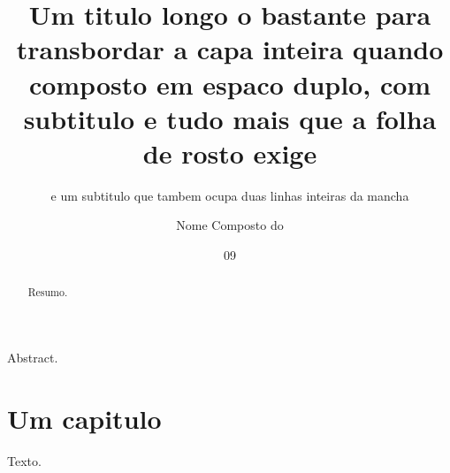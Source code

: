 \documentclass[dsc,doublespacing]{ufrj}
\title{Um titulo longo o bastante para transbordar a capa inteira quando composto
em espaco duplo, com subtitulo e tudo mais que a folha de rosto exige}
\subtitle{e um subtitulo que tambem ocupa duas linhas inteiras da mancha}
\author{Nome Composto do}{Autor de Sobrenome Longo}
\date{09}{2026}
\begin{document}
  \maketitle
  \frontmatter
  \begin{abstract}Resumo.\end{abstract}
  \begin{foreignabstract}Abstract.\end{foreignabstract}
  \tableofcontents
  \mainmatter
  \chapter{Um capitulo}
  Texto.
\end{document}
